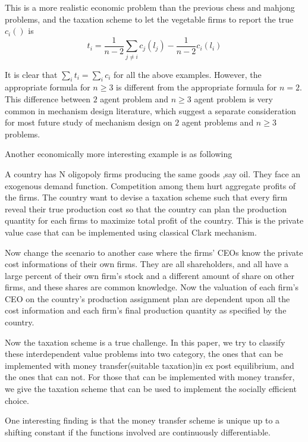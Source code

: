 This is a more realistic economic problem than the previous chess and mahjong problems, and the taxation scheme to let the vegetable firms to report
the true $c_i()$ is
$$ t_i = \frac{1}{n-2}\sum_{j\not=i}c_j(l_j) - \frac{1}{n-2} c_i(l_i)$$

\begin{remark}
It is clear that $\sum_i t_i= \sum_i c_i$ for all the above examples. However, the appropriate formula for $n \geq 3$ is different from the appropriate formula for $n=2$. This difference between $2$ agent problem and $n \geq 3$ agent problem is very common in mechanism design literature, which suggest a separate consideration for most future study of mechanism design on $2$ agent problems and $n \geq 3$ problems.
  
\end{remark}


Another economically more interesting example is as following 
\begin{example}
A country has N oligopoly firms producing the same goods ,say oil. They face an exogenous demand function. Competition among them hurt
aggregate profits of the firms. 
The country want to devise a taxation scheme such that every firm reveal their true production cost so that the country can plan
the production quantity for each firms to maximize total profit of the country. This is the private value case that can be implemented
using classical Clark mechanism. 
\end{example}
Now change the scenario to another case where the firms' CEOs know the private cost informations of their own firms. They are all 
shareholders, and all have a large percent of their own firm's stock and a different amount of share on other firms, and these shares
are common knowledge.  Now the valuation of each firm's CEO on the country's production assignment plan are dependent upon all
the cost information and each firm's final production quantity as specified by the country.
 
Now the taxation scheme is a true challenge. In this paper, we try to classify these interdependent value problems into two category,
the ones that can be implemented with money transfer(suitable taxation)in ex post equilibrium, and the ones that can not. For those
that can be implemented with money transfer, we give the taxation scheme that can be used to implement the socially efficient choice.

One interesting finding is that the money transfer scheme is unique up to a shifting constant if the functions involved are
continuously differentiable.

